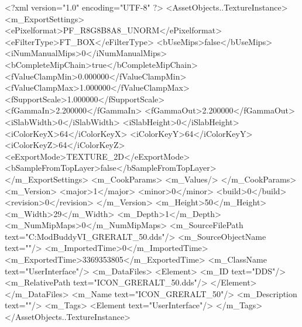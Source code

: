 <?xml version="1.0" encoding="UTF-8" ?>
<AssetObjects..TextureInstance>
	<m_ExportSettings>
		<ePixelformat>PF_R8G8B8A8_UNORM</ePixelformat>
		<eFilterType>FT_BOX</eFilterType>
		<bUseMips>false</bUseMips>
		<iNumManualMips>0</iNumManualMips>
		<bCompleteMipChain>true</bCompleteMipChain>
		<fValueClampMin>0.000000</fValueClampMin>
		<fValueClampMax>1.000000</fValueClampMax>
		<fSupportScale>1.000000</fSupportScale>
		<fGammaIn>2.200000</fGammaIn>
		<fGammaOut>2.200000</fGammaOut>
		<iSlabWidth>0</iSlabWidth>
		<iSlabHeight>0</iSlabHeight>
		<iColorKeyX>64</iColorKeyX>
		<iColorKeyY>64</iColorKeyY>
		<iColorKeyZ>64</iColorKeyZ>
		<eExportMode>TEXTURE_2D</eExportMode>
		<bSampleFromTopLayer>false</bSampleFromTopLayer>
	</m_ExportSettings>
	<m_CookParams>
		<m_Values/>
	</m_CookParams>
	<m_Version>
		<major>1</major>
		<minor>0</minor>
		<build>0</build>
		<revision>0</revision>
	</m_Version>
	<m_Height>50</m_Height>
	<m_Width>29</m_Width>
	<m_Depth>1</m_Depth>
	<m_NumMipMaps>0</m_NumMipMaps>
	<m_SourceFilePath text="C:\Users\asus\Documents\Firaxis ModBuddy\Civilization VI\temppic\ICON_GRERALT_50.dds"/>
	<m_SourceObjectName text=""/>
	<m_ImportedTime>0</m_ImportedTime>
	<m_ExportedTime>3369353805</m_ExportedTime>
	<m_ClassName text="UserInterface"/>
	<m_DataFiles>
		<Element>
			<m_ID text="DDS"/>
			<m_RelativePath text="ICON_GRERALT_50.dds"/>
		</Element>
	</m_DataFiles>
	<m_Name text="ICON_GRERALT_50"/>
	<m_Description text=""/>
	<m_Tags>
		<Element text="UserInterface"/>
	</m_Tags>
</AssetObjects..TextureInstance>

